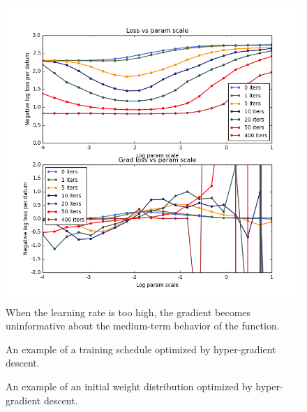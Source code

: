 \documentclass{article}
\begin{document}
\begin{figure}[ht]
\vskip 0.2in
\begin{center}
\centerline{\includegraphics[width=\columnwidth]{../experiments/Jan_9_param_scale_wiggliness/3/fig.png}}
\caption{When the learning rate is too high, the gradient becomes uninformative about the medium-term behavior of the function.}
\label{fig:chaos}
\end{center}
\vskip -0.2in
\end{figure} 


\begin{figure}[ht]
\vskip 0.2in
\begin{center}
\caption{An example of a training schedule optimized by hyper-gradient descent.}
\label{fig:optimal schedule}
\end{center}
\vskip -0.2in
\end{figure} 

\begin{figure}[ht]
\vskip 0.2in
\begin{center}
\caption{An example of an initial weight distribution optimized by hyper-gradient descent.}
\label{fig:optimal schedule}
\end{center}
\vskip -0.2in
\end{figure} 
\end{document}
